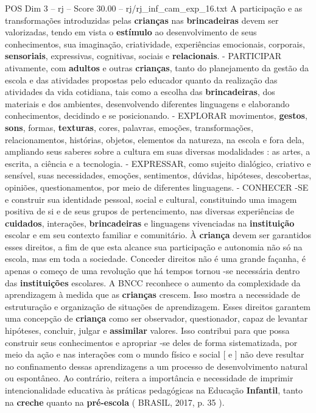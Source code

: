 \begin{textsample}{POS Dim 3 – rj – Score 30.00 – rj/rj\_inf\_cam\_exp\_16.txt}
A participação e as transformações introduzidas pelas \textbf{crianças} nas \textbf{brincadeiras} devem ser valorizadas, tendo em vista o \textbf{estímulo} ao desenvolvimento de seus conhecimentos, sua imaginação, criatividade, experiências emocionais, corporais, \textbf{sensoriais}, expressivas, cognitivas, sociais e \textbf{relacionais}. - PARTICIPAR ativamente, com \textbf{adultos} e outras \textbf{crianças}, tanto do planejamento da gestão da escola e das atividades propostas pelo educador quanto da realização das atividades da vida cotidiana, tais como a escolha das \textbf{brincadeiras}, dos materiais e dos ambientes, desenvolvendo diferentes linguagens e elaborando conhecimentos, decidindo e se posicionando. - EXPLORAR movimentos, \textbf{gestos}, \textbf{sons}, formas, \textbf{texturas}, cores, palavras, emoções, transformações, relacionamentos, histórias, objetos, elementos da natureza, na escola e fora dela, ampliando seus saberes sobre a cultura em suas diversas modalidades : as artes, a escrita, a ciência e a tecnologia. - EXPRESSAR, como sujeito dialógico, criativo e sensível, suas necessidades, emoções, sentimentos, dúvidas, hipóteses, descobertas, opiniões, questionamentos, por meio de diferentes linguagens. - CONHECER -SE e construir sua identidade pessoal, social e cultural, constituindo uma imagem positiva de si e de seus grupos de pertencimento, nas diversas experiências de \textbf{cuidados}, interações, \textbf{brincadeiras} e linguagens vivenciadas na \textbf{instituição} escolar e em seu contexto familiar e comunitário.
À \textbf{criança} devem ser garantidos esses direitos, a fim de que esta alcance sua participação e autonomia não só na escola, mas em toda a sociedade.
Conceder direitos não é uma grande façanha, é apenas o começo de uma revolução que há tempos tornou -se necessária dentro das \textbf{instituições} escolares.
A BNCC reconhece o aumento da complexidade da aprendizagem à medida que as \textbf{crianças} crescem.
Isso mostra a necessidade de estruturação e organização de situações de aprendizagem.
Esses direitos garantem uma concepção de \textbf{criança} como ser observador, questionador, capaz de levantar hipóteses, concluir, julgar e \textbf{assimilar} valores.
Isso contribui para que possa construir seus conhecimentos e apropriar -se deles de forma sistematizada, por meio da ação e nas interações com o mundo físico e social [ e ] não deve resultar no confinamento dessas aprendizagens a um processo de desenvolvimento natural ou espontâneo.
Ao contrário, reitera a importância e necessidade de imprimir intencionalidade educativa às práticas pedagógicas na Educação \textbf{Infantil}, tanto na \textbf{creche} quanto na \textbf{pré-escola} ( BRASIL, 2017, p. 35 ).

\end{textsample}

